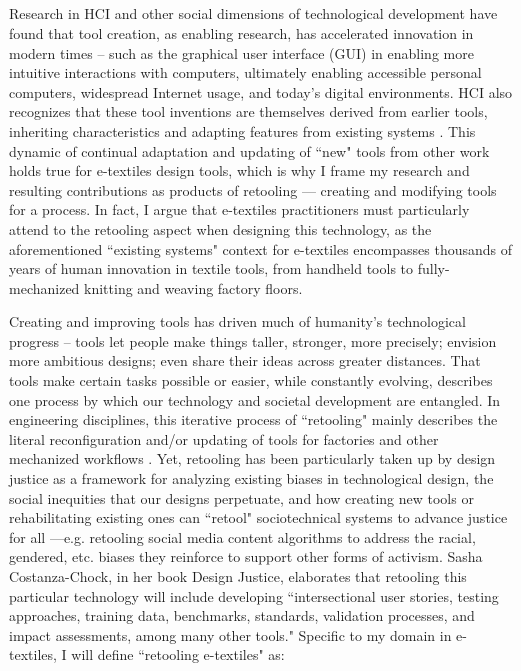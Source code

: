 

\subsection{}

Research in HCI and other social dimensions of technological development have found that tool creation, as enabling research, has accelerated innovation in modern times -- such as the graphical user interface (GUI) in enabling more intuitive interactions with computers, ultimately enabling accessible personal computers, widespread Internet usage, and today's digital environments. HCI also recognizes that these tool inventions are themselves derived from earlier tools, inheriting characteristics and adapting features from existing systems \todo{[61]}. This dynamic of continual adaptation and updating of ``new" tools from other work holds true for e-textiles design tools, which is why I frame my research and resulting contributions as products of retooling --- creating and modifying tools for a process. In fact, I argue that e-textiles practitioners must particularly attend to the retooling aspect when designing this technology, as the aforementioned ``existing systems" context for e-textiles encompasses thousands of years of human innovation in textile tools, from handheld tools to fully-mechanized knitting and weaving factory floors.

Creating and improving tools has driven much of humanity's technological progress -- tools let people make things taller, stronger, more precisely; envision more ambitious designs; even share their ideas across greater distances. That tools make certain tasks possible or easier, while constantly evolving, describes one process by which our technology and societal development are entangled. In engineering disciplines, this iterative process of ``retooling" mainly describes the literal reconfiguration and/or updating of tools for factories and other mechanized workflows \todo{[152]}. Yet, retooling has been particularly taken up by design justice as a framework for analyzing existing biases in technological design, the social inequities that our designs perpetuate, and how creating new tools or rehabilitating existing ones can ``retool" sociotechnical systems to advance justice for all \todo{[33]}---e.g. retooling social media content algorithms to address the racial, gendered, etc. biases they reinforce to support other forms of activism. Sasha Costanza-Chock, in her book Design Justice, elaborates that retooling this particular technology will include developing ``intersectional user stories, testing approaches, training data, benchmarks, standards, validation processes, and impact assessments, among many other tools." Specific to my domain in e-textiles, I will define ``retooling e-textiles" as:

